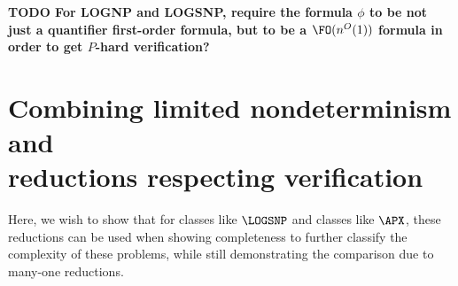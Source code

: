 \documentclass{article}
\newcommand{\todo}[1]{\textbf{TODO #1}}
\begin{document}
\todo{For LOGNP and LOGSNP, require the formula $\phi$ to be not just a quantifier first-order formula, but to be a $\FO(n^O(1))$ formula in order to get $P$-hard verification?}

\section[Combining limited nondeterminism and reductions respecting verification]{Combining limited nondeterminism and \\ reductions respecting verification}

Here, we wish to show that for classes like $\LOGSNP$ and classes like $\APX$, these reductions can be used when showing completeness to further classify the complexity of these problems, while still demonstrating the comparison due to many-one reductions.

\printbibliography
\end{document}
